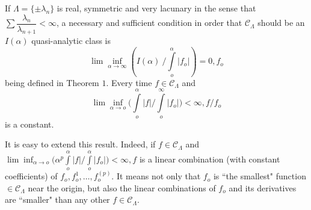 \begin{theorem}\label{chap22:thm2}%
 If $\Lambda = \{\pm \lambda_n \}$ is real, symmetric and very
 lacunary in the sense that $\sum \dfrac{\lambda_n}{\lambda_{n+1}} <
 \infty$, a necessary and sufficient condition in order that
 $\mathscr{C}_\Lambda$ should be an $I(\alpha)$ quasi-analytic class
 is 
$$\lim\inf_{\alpha\rightarrow \infty}\left(I(\alpha) ~ \Big/
 \int\limits_o^\alpha | f_o |\right) = 0, f_o $$ 
being defined in Theorem  $1$. Every time $f \in \mathscr{C}_\Lambda$ and 
$$\lim\inf_{\alpha
 \rightarrow o} \Big( \int\limits_o^\alpha | f | /
 \int\limits_o^\infty | f_o | \Big) < \infty, f/f_o$$ is a
constant. 
\end{theorem}

\begin{remark*}%
 It is easy to extend this result. Indeed, if $f \in
 \mathscr{C}_\Lambda$ and\break  $\lim\inf_{\alpha \rightarrow o} \Big(
 \alpha^p \int\limits_o^\alpha | f | \Big/ \int\limits_o^\alpha | f_o
 | \Big) < \infty, f$ is a linear combination (with constant
 coefficients) of $f_o,f_o^1,\ldots, f_o^{(p)}$. It means not only
 that $f_o$ is ``the smallest" function $\in \mathscr{C}_\Lambda$
 near the origin, but also the linear combinations of $f_o$ and its
 derivatives are ``smaller" than any other $f \in
 \mathscr{C}_\Lambda$. 
\end{remark*}
